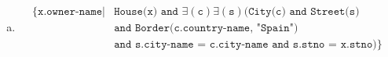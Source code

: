 \documentclass[11pt]{article}
\def\code#1{\texttt{#1}}
\def\c#1{\texttt{#1}}
\def\expr#1#2{\{\code{#1} | #2\}}
\begin{document}
\begin{enumerate}[a.]
    \item
      \begin{equation*}
      \begin{aligned}
        \expr{x.owner-name} {
          &\c{House(x) and } \exists(\c{c})\exists(\c{s}) (\c{City(c) and Street(s)} \\
          &\c{and Border(c.country-name, "Spain")} \\
          &\c{and s.city-name = c.city-name and s.stno = x.stno}
        )}
      \end{aligned}
      \end{equation*}

  \end{enumerate}
\end{document}
